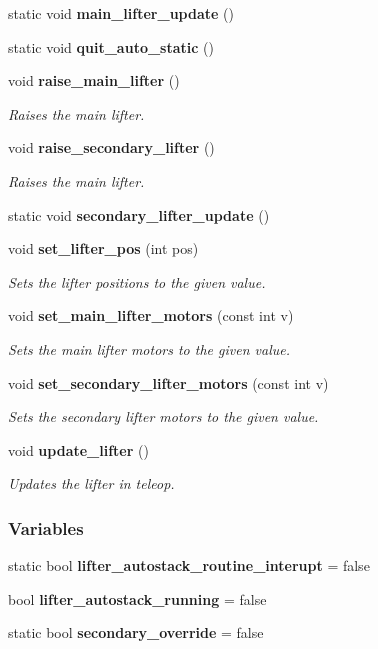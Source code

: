 \begin{DoxyCompactItemize}
static void \textbf{ main\+\_\+lifter\+\_\+update} ()
\item 
static void \textbf{ quit\+\_\+auto\+\_\+static} ()
\item 
void \textbf{ raise\+\_\+main\+\_\+lifter} ()
\begin{DoxyCompactList}\small\item\em Raises the main lifter. \end{DoxyCompactList}\item 
void \textbf{ raise\+\_\+secondary\+\_\+lifter} ()
\begin{DoxyCompactList}\small\item\em Raises the main lifter. \end{DoxyCompactList}\item 
static void \textbf{ secondary\+\_\+lifter\+\_\+update} ()
\item 
void \textbf{ set\+\_\+lifter\+\_\+pos} (int pos)
\begin{DoxyCompactList}\small\item\em Sets the lifter positions to the given value. \end{DoxyCompactList}\item 
void \textbf{ set\+\_\+main\+\_\+lifter\+\_\+motors} (const int v)
\begin{DoxyCompactList}\small\item\em Sets the main lifter motors to the given value. \end{DoxyCompactList}\item 
void \textbf{ set\+\_\+secondary\+\_\+lifter\+\_\+motors} (const int v)
\begin{DoxyCompactList}\small\item\em Sets the secondary lifter motors to the given value. \end{DoxyCompactList}\item 
void \textbf{ update\+\_\+lifter} ()
\begin{DoxyCompactList}\small\item\em Updates the lifter in teleop. \end{DoxyCompactList}\end{DoxyCompactItemize}
\subsubsection*{Variables}
\begin{DoxyCompactItemize}
\item 
static bool \textbf{ lifter\+\_\+autostack\+\_\+routine\+\_\+interupt} = false
\item 
bool \textbf{ lifter\+\_\+autostack\+\_\+running} = false
\item 
static bool \textbf{ secondary\+\_\+override} = false
\end{DoxyCompactItemize}


